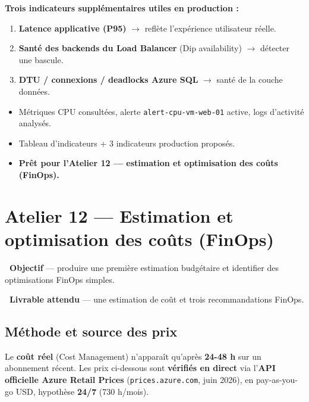 \documentclass[11pt,a4paper]{article}
\newcommand{\emo}[1]{\raisebox{-0.14em}{\twemoji{#1}}}
\newcommand{\eTarget}{\emo{1f3af}}
\newcommand{\ePackage}{\emo{1f4e6}}
\newcommand{\arr}{\ensuremath{\rightarrow}}
\newcommand{\code}[1]{\texttt{#1}}
\begin{document}
\textbf{Trois indicateurs supplémentaires utiles en production :}
\begin{enumerate}
  \item \textbf{Latence applicative (P95)} \arr{} reflète l'expérience utilisateur réelle.
  \item \textbf{Santé des backends du Load Balancer} (Dip availability) \arr{} détecter une bascule.
  \item \textbf{DTU / connexions / deadlocks Azure SQL} \arr{} santé de la couche données.
\end{enumerate}

\begin{etatbox}
\begin{itemize}
  \item Métriques CPU consultées, alerte \code{alert-cpu-vm-web-01} active, logs d'activité analysés.
  \item Tableau d'indicateurs + 3 indicateurs production proposés.
  \item \textbf{Prêt pour l'Atelier 12 — estimation et optimisation des coûts (FinOps).}
\end{itemize}
\end{etatbox}


\section{Atelier 12 — Estimation et optimisation des coûts (FinOps)}

\begin{fiche}
\textbf{\eTarget~Objectif} — produire une première estimation budgétaire et identifier des optimisations FinOps simples.

\textbf{\ePackage~Livrable attendu} — une estimation de coût et trois recommandations FinOps.
\end{fiche}

\subsection{Méthode et source des prix}
Le \textbf{coût réel} (Cost Management) n'apparaît qu'après \textbf{24-48 h} sur un abonnement récent. Les prix
ci-dessous sont \textbf{vérifiés en direct} via l'\textbf{API officielle Azure Retail Prices}
(\code{prices.azure.com}, juin 2026), en pay-as-you-go USD, hypothèse \textbf{24/7} (730 h/mois).
\end{document}

